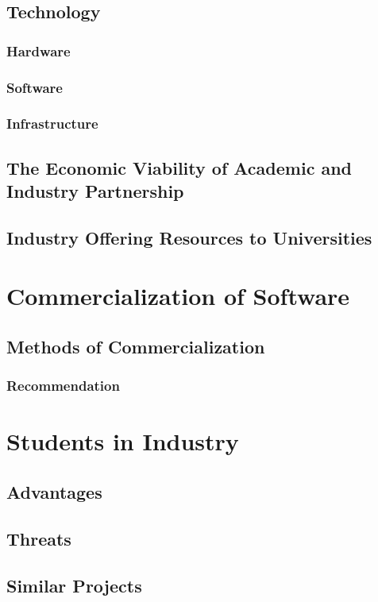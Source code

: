 \subsection{Technology}
\subsubsection{Hardware}
\subsubsection{Software}
\subsubsection{Infrastructure}
\subsection{The Economic Viability of Academic and Industry Partnership}
\subsection{Industry Offering Resources to Universities}

\section{Commercialization of Software}
\subsection{Methods of Commercialization}
\subsubsection{Recommendation}

\section{Students in Industry}
\subsection{Advantages}
\subsection{Threats}
\subsection{Similar Projects}

